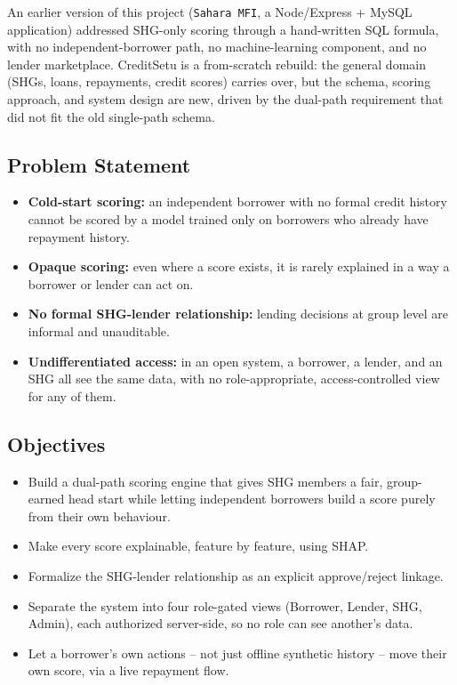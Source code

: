 \documentclass[11pt,a4paper]{article}
\begin{document}
An earlier version of this project (\texttt{Sahara MFI}, a
Node/Express + MySQL application) addressed SHG-only scoring through a
hand-written SQL formula, with no independent-borrower path, no
machine-learning component, and no lender marketplace. CreditSetu is a
from-scratch rebuild: the general domain (SHGs, loans, repayments,
credit scores) carries over, but the schema, scoring approach, and
system design are new, driven by the dual-path requirement that did
not fit the old single-path schema.

\subsection{Problem Statement}
\begin{itemize}[leftmargin=0.7cm]
    \item \textbf{Cold-start scoring:} an independent borrower with no
    formal credit history cannot be scored by a model trained only on
    borrowers who already have repayment history.
    \item \textbf{Opaque scoring:} even where a score exists, it is
    rarely explained in a way a borrower or lender can act on.
    \item \textbf{No formal SHG-lender relationship:} lending decisions
    at group level are informal and unauditable.
    \item \textbf{Undifferentiated access:} in an open system, a
    borrower, a lender, and an SHG all see the same data, with no
    role-appropriate, access-controlled view for any of them.
\end{itemize}

\subsection{Objectives}
\begin{itemize}[leftmargin=0.7cm]
    \item Build a dual-path scoring engine that gives SHG members a
    fair, group-earned head start while letting independent borrowers
    build a score purely from their own behaviour.
    \item Make every score explainable, feature by feature, using
    SHAP.
    \item Formalize the SHG-lender relationship as an explicit
    approve/reject linkage.
    \item Separate the system into four role-gated views (Borrower,
    Lender, SHG, Admin), each authorized server-side, so no role can
    see another's data.
    \item Let a borrower's own actions -- not just offline synthetic
    history -- move their own score, via a live repayment flow.
\end{itemize}
\end{document}
